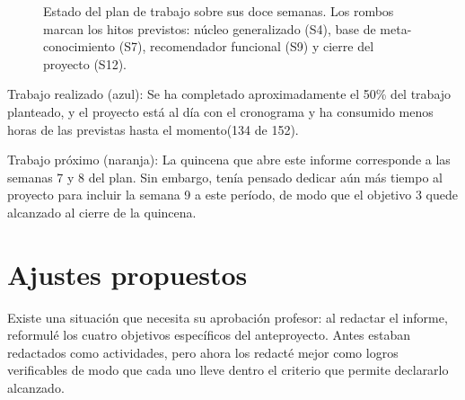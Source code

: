 \documentclass[11pt,letterpaper]{article}
\begin{document}
\begin{figure}[h]
\caption{Estado del plan de trabajo sobre sus doce semanas. Los rombos marcan los
hitos previstos: núcleo generalizado (S4), base de meta-conocimiento (S7),
recomendador funcional (S9) y cierre del proyecto (S12).}
\label{fig:cronograma}
\end{figure}

Trabajo realizado (azul): Se ha completado aproximadamente el 50\% del trabajo planteado, y el proyecto está al día con el cronograma y ha consumido menos horas de las previstas hasta el momento(134 de 152).

Trabajo próximo (naranja): La quincena que abre este informe corresponde a las semanas 7 y 8 del plan. Sin embargo, tenía pensado dedicar aún más tiempo al proyecto para incluir la semana 9 a este período, de modo que el objetivo 3 quede alcanzado al cierre de la quincena. 

\newpage
\section{Ajustes propuestos}

Existe una situación que necesita su aprobación profesor: al redactar el informe, reformulé los cuatro objetivos específicos del anteproyecto. Antes estaban redactados como actividades, pero ahora los redacté mejor como logros verificables de modo que cada uno lleve dentro el criterio que permite declararlo alcanzado.
\end{document}

